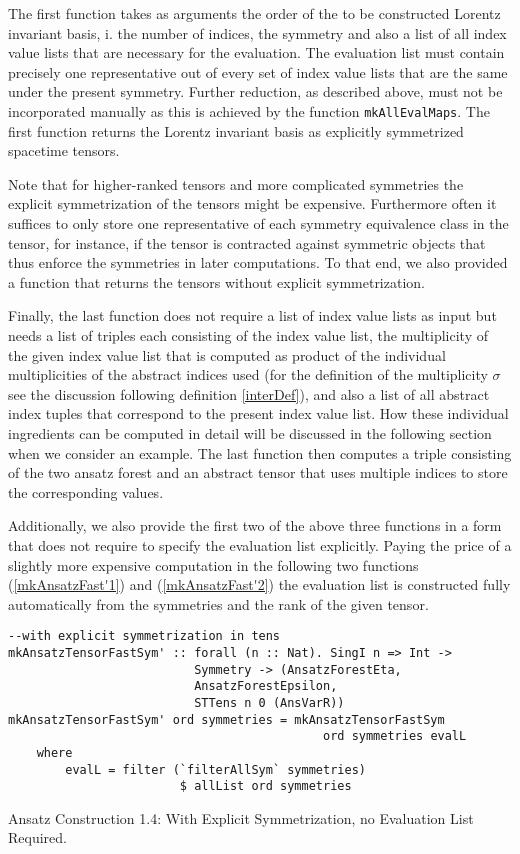The first function takes as arguments the order of the to be constructed Lorentz invariant basis, i. the number of indices, the symmetry and also a list of all index value lists that are necessary for the evaluation. The evaluation list must contain precisely one representative out of every set of index value lists that are the same under the present symmetry. Further reduction, as described above, must not be incorporated manually as this is achieved by the function \texttt{mkAllEvalMaps}.
The first function returns the Lorentz invariant basis as explicitly symmetrized spacetime tensors.

Note that for higher-ranked tensors and more complicated symmetries the explicit symmetrization of the tensors might be expensive. Furthermore often it suffices to only store one representative of each symmetry equivalence class in the tensor, for instance, if the tensor is contracted against symmetric objects that thus enforce the symmetries in later computations. To that end, we also provided a function that returns the tensors without explicit symmetrization.

Finally, the last function does not require a list of index value lists as input but needs a list of triples each consisting of the index value list, the multiplicity of the given index value list that is computed as product of the individual multiplicities of the abstract indices used (for the definition of the multiplicity $\sigma$ see the discussion following definition \ref{interDef}), and also a list of all abstract index tuples that correspond to the present index value list. How these individual ingredients can be computed in detail will be discussed in the following section when we consider an example. The last function then computes a triple consisting of the two ansatz forest and an abstract tensor that uses multiple indices to store the corresponding values. 

Additionally, we also provide the first two of the above three functions in a form that does not require to specify the evaluation list explicitly. Paying the price of a slightly more expensive computation in the following two functions (\ref{mkAnsatzFast'1}) and (\ref{mkAnsatzFast'2}) the evaluation list is constructed fully automatically from the symmetries and the rank of the given tensor.

\begin{listing}[hbt!]
\begin{verbatim}
--with explicit symmetrization in tens
mkAnsatzTensorFastSym' :: forall (n :: Nat). SingI n => Int ->
                          Symmetry -> (AnsatzForestEta,
                          AnsatzForestEpsilon,
                          STTens n 0 (AnsVarR))
mkAnsatzTensorFastSym' ord symmetries = mkAnsatzTensorFastSym
                                            ord symmetries evalL
    where
        evalL = filter (`filterAllSym` symmetries) 
                        $ allList ord symmetries
\end{verbatim} 
\caption{Ansatz Construction 1.4: With Explicit Symmetrization, no Evaluation List Required.}\label{mkAnsatzFast'1}
\end{listing}

